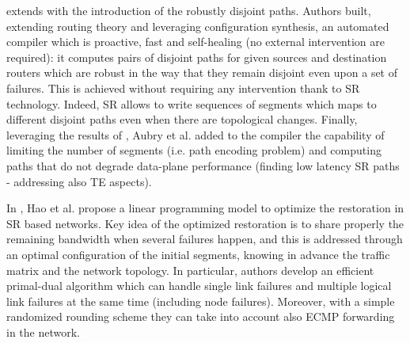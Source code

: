 \cite{aubry2018robustly} extends \cite{trafficduplication} with the introduction of the robustly disjoint paths. Authors built, extending routing theory and leveraging configuration synthesis, an automated compiler which is proactive, fast and self-healing (no external intervention are required): it computes pairs of disjoint paths for given sources and destination routers which are robust in the way that they remain disjoint even upon a set of failures. This is achieved without requiring any intervention thank to SR technology. Indeed, SR allows to write sequences of segments which maps to different disjoint paths even when there are topological changes. Finally, leveraging the results of \cite{trafficduplication}, Aubry et al. added to the compiler the capability of limiting the number of segments (i.e. path encoding problem) and computing paths that do not degrade data-plane performance (finding low latency SR paths - addressing also TE aspects). %

In \cite{optimizingrestoration}, Hao et al. propose a linear programming model to optimize the restoration in SR based networks. Key idea of the optimized restoration is to share properly the remaining bandwidth when several failures happen, and this is addressed through an optimal configuration of the initial segments, knowing in advance the traffic matrix and the network topology. In particular, authors develop an efficient primal-dual algorithm which can handle single link failures and multiple logical link failures at the same time (including node failures). Moreover, with a simple randomized rounding scheme they can take into account also ECMP forwarding in the network. 


